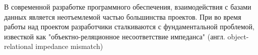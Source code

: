 
В современной разработке программного обеспечения, взаимодействия с базами данных является неотъемлемой частью большинства проектов. При во время работы над проектом разработчики сталкиваются с фундаментальной проблемой, известкой как "объектно-реляционное несоответствие импеданса" (англ. object-relational impedance mismatch)




